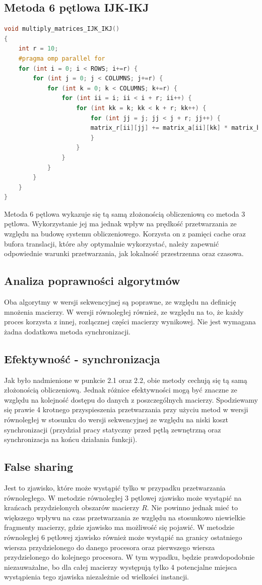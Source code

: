 \documentclass{scrartcl}
\begin{document}
\subsection{Metoda 6 pętlowa IJK-IKJ}
\begin{lstlisting}[language=C++, caption={Metoda sześciopętlowa}]
void multiply_matrices_IJK_IKJ()
{
	int r = 10;
	#pragma omp parallel for
	for (int i = 0; i < ROWS; i+=r) {
		for (int j = 0; j < COLUMNS; j+=r) {
			for (int k = 0; k < COLUMNS; k+=r) {
				for (int ii = i; ii < i + r; ii++) {
					for (int kk = k; kk < k + r; kk++) {
						for (int jj = j; jj < j + r; jj++) {
						matrix_r[ii][jj] += matrix_a[ii][kk] * matrix_b[kk][jj];
						}
					}
				}
			}
		}
	}
}
\end{lstlisting}
Metoda 6 pętlowa wykazuje się tą samą złożonością obliczeniową co metoda 3 pętlowa. Wykorzystanie jej ma jednak wpływ na prędkość przetwarzania ze względu na budowę systemu obliczeniowego. Korzysta on z pamięci cache oraz bufora translacji, które aby optymalnie wykorzystać, należy zapewnić odpowiednie warunki przetwarzania, jak lokalność przestrzenna oraz czasowa.
\subsection{Analiza poprawności algorytmów}
Oba algorytmy w wersji sekwencyjnej są poprawne, ze względu na definicję mnożenia macierzy. W wersji równoległej również, ze względu na to, że każdy proces korzysta z innej, rozłącznej części macierzy wynikowej. Nie jest wymagana żadna dodatkowa metoda synchronizacji.
\subsection{Efektywność - synchronizacja}
Jak było nadmienione w punkcie 2.1 oraz 2.2, obie metody cechują się tą samą złożonością obliczeniową. Jednak różnice efektywności mogą być znaczne ze względu na kolejność dostępu do danych z poszczególnych macierzy. Spodziewamy się prawie 4 krotnego przyspieszenia przetwarzania przy użyciu metod w wersji równoległej w stosunku do wersji sekwencyjnej ze względu na niski koszt synchronizacji (przydział pracy statyczny przed pętlą zewnętrzną oraz synchronizacja na końcu działania funkcji).
\subsection{False sharing}
Jest to zjawisko, które może wystąpić tylko w przypadku przetwarzania równoległego. W metodzie równoległej 3 pętlowej zjawisko może wystąpić na krańcach przydzielonych obszarów macierzy $R$. Nie powinno jednak mieć to większego wpływu na czas przetwarzania ze względu na stosunkowo niewielkie fragmenty macierzy, gdzie zjawisko ma możliwość się pojawić.
W metodzie równoległej 6 pętlowej zjawisko również może wystąpić na granicy ostatniego wiersza przydzielonego do danego procesora oraz pierwszego wiersza przydzielonego do kolejnego procesora. W tym wypadku, będzie prawdopodobnie niezauważalne, bo dla całej macierzy występują tylko 4 potencjalne miejsca wystąpienia tego zjawiska niezależnie od wielkości instancji.
\newpage
\end{document}
